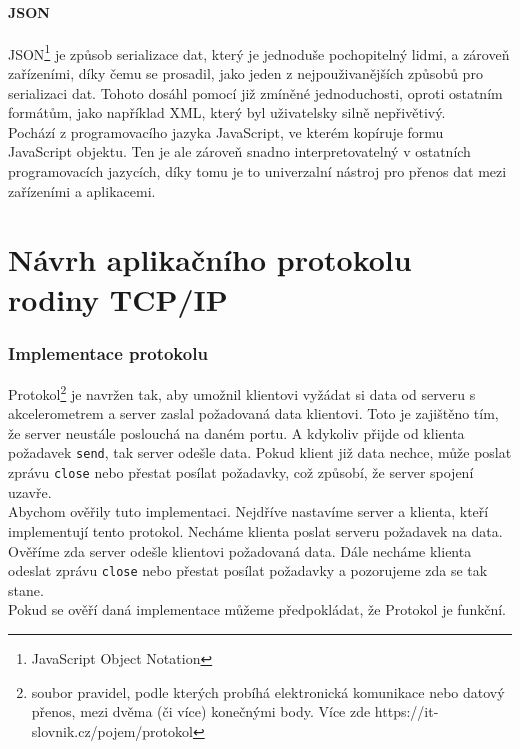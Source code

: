 \documentclass[12pt]{report}			%
\begin{document}
				\subsection{JSON}
				
				
JSON\footnote{JavaScript Object Notation} je způsob serializace dat, který je jednoduše pochopitelný lidmi, a zároveň zařízeními, díky čemu se prosadil, jako jeden z nejpouživanějších způsobů pro serializaci dat. Tohoto dosáhl pomocí již zmíněné jednoduchosti, oproti ostatním formátům, jako například XML, který byl uživatelsky silně nepřivětivý. 
\\
Pochází z programovacího jazyka JavaScript, ve kterém kopíruje formu JavaScript objektu. Ten je ale zároveň snadno interpretovatelný v ostatních programovacích jazycích, díky tomu je to univerzalní nástroj pro přenos dat mezi zařízeními a aplikacemi. \cite{JSON1}\cite{JSON2}\cite{JSON3}\cite{JSON4}


			

	\part{Návrh aplikačního protokolu rodiny TCP/IP}



\section{Implementace protokolu}
Protokol\footnote{soubor pravidel, podle kterých probíhá elektronická komunikace nebo datový přenos, mezi dvěma (či více) konečnými body. Více zde https://it-slovnik.cz/pojem/protokol} 
je navržen tak, aby umožnil klientovi vyžádat si data od serveru s akcelerometrem a server zaslal požadovaná data klientovi. Toto je zajištěno tím, že server neustále poslouchá na daném portu. A kdykoliv přijde od klienta požadavek \texttt{send}, tak server odešle data. Pokud klient již data nechce, může poslat zprávu \texttt{close} nebo přestat posílat požadavky, což způsobí, že server spojení uzavře.
\\
Abychom ověřily tuto implementaci. Nejdříve nastavíme server a klienta, kteří implementují tento protokol. Necháme klienta poslat serveru požadavek na data. Ověříme zda server odešle klientovi požadovaná data. Dále necháme klienta odeslat zprávu \texttt{close} nebo přestat posílat požadavky a pozorujeme zda se tak stane.
\\
Pokud se ověří daná implementace můžeme předpokládat, že Protokol je funkční.
\\
\end{document}

